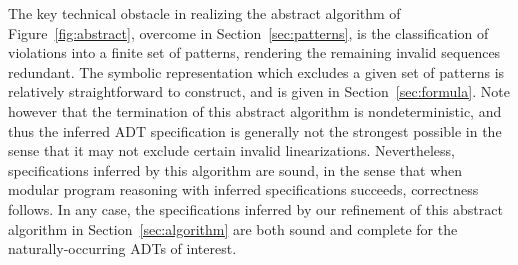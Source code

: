 The key technical obstacle in realizing the abstract algorithm of
Figure~\ref{fig:abstract}, overcome in Section~\ref{sec:patterns}, is the
classification of violations into a finite set of patterns, rendering the
remaining invalid sequences redundant. The symbolic representation which
excludes a given set of patterns is relatively straightforward to construct, and
is given in Section~\ref{sec:formula}. Note however that the termination of this
abstract algorithm is nondeterministic, and thus the inferred ADT specification
is generally not the strongest possible in the sense that it may not exclude
certain invalid linearizations. Nevertheless, specifications inferred by this
algorithm are sound, in the sense that when modular program reasoning with
inferred specifications succeeds, correctness follows. In any case, the
specifications inferred by our refinement of this abstract algorithm in
Section~\ref{sec:algorithm} are both sound and complete for the
naturally-occurring ADTs of interest.
